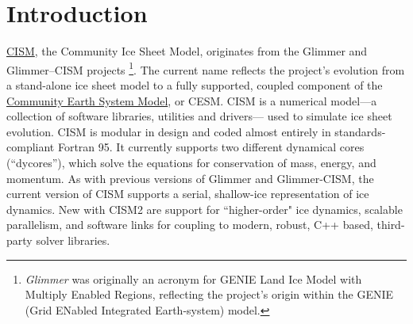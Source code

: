 
\section{Introduction}
%
\href{https://cism.github.io/}{CISM}, 
the Community Ice Sheet Model, originates from the Glimmer and Glimmer--CISM 
projects \citep{Rutt2009}\footnote{
{\it Glimmer} was originally an acronym for GENIE Land Ice Model with Multiply Enabled Regions,
reflecting the project's origin within the GENIE (Grid ENabled Integrated Earth-system) model.}.
The current name reflects
the project's evolution from a stand-alone ice sheet model to a fully supported, 
coupled component of the \href{http://www2.cesm.ucar.edu/}{Community Earth System Model}, or CESM. 
CISM is a numerical model---a collection of software libraries, utilities and drivers---
used to simulate ice sheet evolution. CISM is modular in design and coded almost 
entirely in standards-compliant Fortran 95. It currently supports two different 
dynamical cores (``dycores''), which solve the equations for conservation of mass, energy, and momentum. 
As with previous versions of Glimmer and Glimmer-CISM, the current version of CISM 
supports a serial, shallow-ice representation of ice dynamics. 
New with CISM2 are support for ``higher-order" ice dynamics, scalable parallelism, 
and software links for coupling to modern, robust, C++ based, third-party solver libraries. 

%
